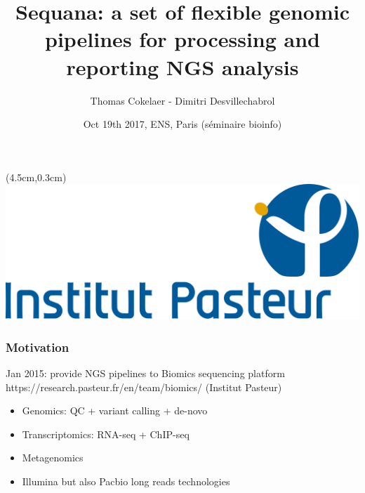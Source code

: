 \documentclass{beamer}
\title[Sequana]{Sequana: a set of flexible genomic pipelines for processing 
and reporting NGS analysis}
\author[T. Cokelaer]{Thomas Cokelaer - Dimitri Desvillechabrol}
\institute{Institut Pasteur}
\date{Oct 19th 2017, ENS, Paris (séminaire bioinfo)}
\begin{document}

\begin{frame}[plain]
    \titlepage
    \begin{textblock*}{5cm}(4.5cm,0.3cm)
        \includegraphics[scale=0.09]{images/Institut_Pasteur.png}
    \end{textblock*}
\end{frame}



%
%
%



\begin{frame}
\frametitle{Motivation}
\begin{block}{Jan 2015: provide NGS pipelines to Biomics sequencing platform 
https://research.pasteur.fr/en/team/biomics/ (Institut Pasteur)}
 \begin{itemize}
  \item Genomics: QC + variant calling + de-novo
  \item Transcriptomics: RNA-seq + ChIP-seq 
  \item Metagenomics
  \item Illumina but also Pacbio long reads technologies
 \end{itemize}
\end{block} 
\end{frame}
\end{document}
